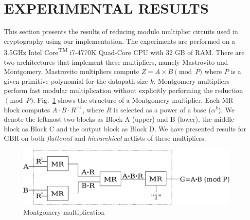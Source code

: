 %

%

\section{EXPERIMENTAL RESULTS}
\label{sec:exp}
\iffalse
This section presents the results of reducing modulo multiplier
circuits used in cryptography using our implementation. The
experiments are performed on a 3.5GHz Intel 
Core\textsuperscript{TM} i7-4770K Quad-Core CPU with 32 GB of RAM. There are
two architectures that implement these multipliers, namely Mastrovito
and Montgomery. 
Mastrovito multipliers compute $Z = A\times B \pmod{
  P}$
where $P$ is a given primitive polynomial for the datapath size
$k$. 
Montgomery multipliers perform fast modular multiplication without
explicitly performing the reduction $\pmod{P}$. 
Fig.~\ref{montfig} shows the structure of a Montgomery
multiplier. Each MR block computes $A\cdot B\cdot R^{-1}$, where $R$
is selected as a power of a base ($\alpha^{k}$). We denote the leftmost
two blocks as Block A (upper) and B (lower), the middle block as Block
C and the output block as Block D. We have presented results for GBR
on both \textit{flattened} and \textit{hierarchical} netlists of these
multipliers. 

\begin{figure}[H]
  \centering
  \includegraphics[scale=0.34]{new_mmcircuit}
  \caption{Montgomery multiplication}
  \label{montfig}
  \end{figure}


